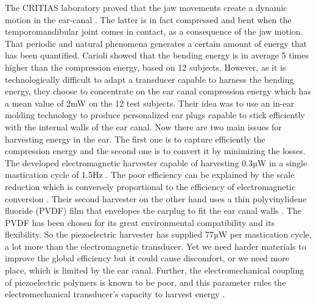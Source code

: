 \documentclass[3p,twocolumn,preprint]{elsarticle}
\begin{document}
The CRITIAS laboratory proved that the jaw movements create a dynamic motion in the ear-canal \cite{Carioli2016}. The latter is in fact compressed and bent when the temporomandibular joint comes in contact, as a consequence of the jaw motion. That periodic and natural phenomena generates a certain amount of energy that has been quantified. Carioli showed that the bending energy is in average 5 times higher than the compression energy, based on 12 subjects. However, as it is technologically difficult to adapt a transducer capable to harness the bending energy, they choose to concentrate on the ear canal compression energy which has a mean value of 2mW on the 12 test subjects. Their idea was to use an in-ear molding technology to produce personalized ear plugs capable to stick efficiently with the internal walls of the ear canal. Now there are two main issues for harvesting energy in the ear. The first one is to capture efficiently the compression energy and the second one is to convert it by minimizing the losses.\\
The developed electromagnetic harvester capable of harvesting 0.3µW in a single mastication cycle of 1.5Hz \cite{Delnavaz2012}. The poor efficiency can be explained by the scale reduction which is conversely proportional to the efficiency of electromagnetic conversion \cite{Arnold2007}. Their second harvester on the other hand uses a thin polyvinylidene fluoride (PVDF) film that envelopes the earplug to fit the ear canal walls \cite{Delnavaz2013}. The PVDF has been chosen for its great environmental compatibility and its flexibility. So the piezoelectric harvester has supplied 77µW per mastication cycle, a lot more than the electromagnetic transducer. Yet we need harder materials to improve the global efficiency but it could cause discomfort, or we need more place, which is limited by the ear canal. Further, the electromechanical coupling of piezoelectric polymers is known to be poor, and this parameter rules the electromechanical transducer’s capacity to harvest energy \cite{Roundy2005}.
\end{document}
